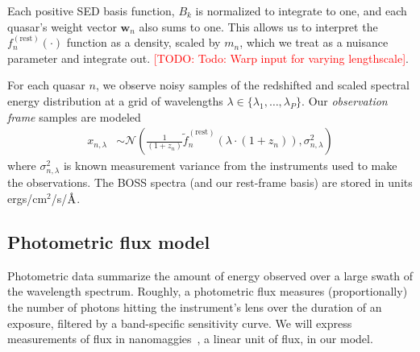 \documentclass{article}
\newcommand{\angstrom}{\textup{\AA}}
\newcommand{\red}[1]{\textcolor{red}{[TODO: #1]}}
\begin{document}
Each positive SED basis function, $B_k$ is normalized to integrate to one, and each quasar's weight vector $\mathbf{w}_n$ also sums to one.  This allows us to interpret the $f^{(\text{rest})}_n(\cdot)$ function as a density, scaled by $m_n$, which we treat as a nuisance parameter and integrate out.  
\red{Todo: Warp input for varying lengthscale}.  

For each quasar $n$, we observe noisy samples of the redshifted and scaled spectral energy distribution at a grid of wavelengths $\lambda \in \{\lambda_1, \dots, \lambda_P \}$.  Our \emph{observation frame} samples are modeled
\begin{align}
  x_{n, \lambda} 
    &\sim \mathcal{N}\left( \frac{1}{(1 + z_n)} \tilde f_n^{(\text{rest})}( \lambda \cdot (1 + z_n) ), \sigma_{n,\lambda}^2 \right)
    \label{eq:spec} 
\end{align}
where $\sigma_{n, \lambda}^2$ is known measurement variance from the instruments
used to make the observations.
The BOSS spectra (and our rest-frame basis) are stored in units ergs/cm$^2$/s/$\angstrom$. 

\subsection{Photometric flux model }
Photometric data summarize the amount of energy observed over a large swath of the wavelength spectrum.  Roughly, a photometric flux measures (proportionally) the number of photons hitting the instrument's lens over the duration of an exposure, filtered by a band-specific sensitivity curve. 
We will express measurements of flux in nanomaggies~\cite{sdssnanomaggies}, a linear unit of flux, in our model.
\end{document}

